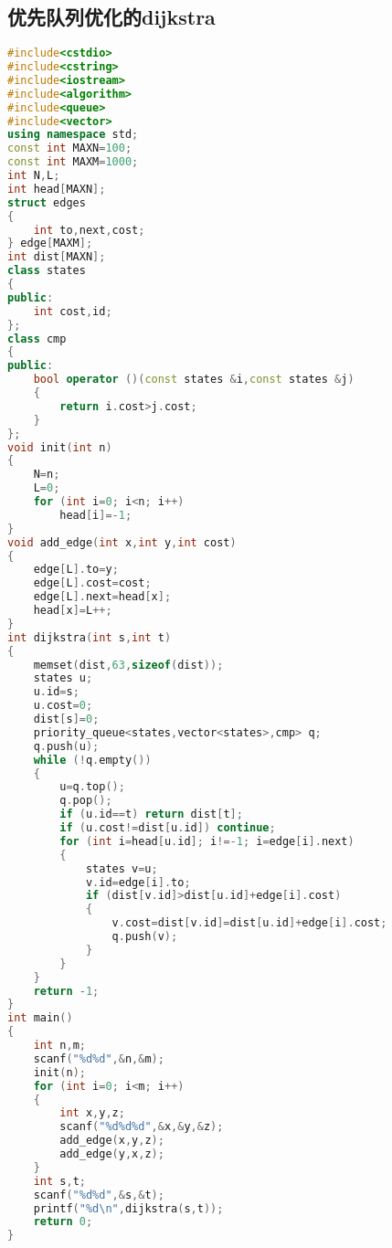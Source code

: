 \subsection{优先队列优化的dijkstra}
    \begin{lstlisting}[language=c++]
#include<cstdio>
#include<cstring>
#include<iostream>
#include<algorithm>
#include<queue>
#include<vector>
using namespace std;
const int MAXN=100;
const int MAXM=1000;
int N,L;
int head[MAXN];
struct edges
{
    int to,next,cost;
} edge[MAXM];
int dist[MAXN];
class states
{
public:
    int cost,id;
};
class cmp
{
public:
    bool operator ()(const states &i,const states &j)
    {
        return i.cost>j.cost;
    }
};
void init(int n)
{
    N=n;
    L=0;
    for (int i=0; i<n; i++)
        head[i]=-1;
}
void add_edge(int x,int y,int cost)
{
    edge[L].to=y;
    edge[L].cost=cost;
    edge[L].next=head[x];
    head[x]=L++;
}
int dijkstra(int s,int t)
{
    memset(dist,63,sizeof(dist));
    states u;
    u.id=s;
    u.cost=0;
    dist[s]=0;
    priority_queue<states,vector<states>,cmp> q;
    q.push(u);
    while (!q.empty())
    {
        u=q.top();
        q.pop();
        if (u.id==t) return dist[t];
        if (u.cost!=dist[u.id]) continue;
        for (int i=head[u.id]; i!=-1; i=edge[i].next)
        {
            states v=u;
            v.id=edge[i].to;
            if (dist[v.id]>dist[u.id]+edge[i].cost)
            {
                v.cost=dist[v.id]=dist[u.id]+edge[i].cost;
                q.push(v);
            }
        }
    }
    return -1;
}
int main()
{
    int n,m;
    scanf("%d%d",&n,&m);
    init(n);
    for (int i=0; i<m; i++)
    {
        int x,y,z;
        scanf("%d%d%d",&x,&y,&z);
        add_edge(x,y,z);
        add_edge(y,x,z);
    }
    int s,t;
    scanf("%d%d",&s,&t);
    printf("%d\n",dijkstra(s,t));
    return 0;
}
    \end{lstlisting}